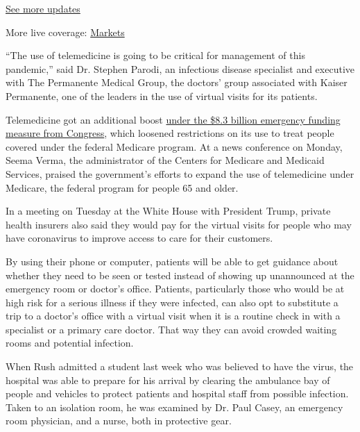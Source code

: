 \href{https://www.nytimes.com/2020/08/04/world/coronavirus-covid-19.html?action=click\&pgtype=Article\&state=default\&region=MAIN_CONTENT_1\&context=storylines_live_updates}{See
more updates}

More live coverage:
\href{https://www.nytimes.com/live/2020/08/03/business/stock-market-today-coronavirus?action=click\&pgtype=Article\&state=default\&region=MAIN_CONTENT_1\&context=storylines_live_updates}{Markets}

``The use of telemedicine is going to be critical for management of this
pandemic,'' said Dr. Stephen Parodi, an infectious disease specialist
and executive with The Permanente Medical Group, the doctors' group
associated with Kaiser Permanente, one of the leaders in the use of
virtual visits for its patients.

Telemedicine got an additional boost
\href{https://www.nytimes.com/2020/03/04/us/politics/coronavirus-emergency-aid-congress.html}{under
the \$8.3 billion emergency funding measure from Congress}, which
loosened restrictions on its use to treat people covered under the
federal Medicare program. At a news conference on Monday, Seema Verma,
the administrator of the Centers for Medicare and Medicaid Services,
praised the government's efforts to expand the use of telemedicine under
Medicare, the federal program for people 65 and older.

In a meeting on Tuesday at the White House with President Trump, private
health insurers also said they would pay for the virtual visits for
people who may have coronavirus to improve access to care for their
customers.

By using their phone or computer, patients will be able to get guidance
about whether they need to be seen or tested instead of showing up
unannounced at the emergency room or doctor's office. Patients,
particularly those who would be at high risk for a serious illness if
they were infected, can also opt to substitute a trip to a doctor's
office with a virtual visit when it is a routine check in with a
specialist or a primary care doctor. That way they can avoid crowded
waiting rooms and potential infection.

When Rush admitted a student last week who was believed to have the
virus, the hospital was able to prepare for his arrival by clearing the
ambulance bay of people and vehicles to protect patients and hospital
staff from possible infection. Taken to an isolation room, he was
examined by Dr. Paul Casey, an emergency room physician, and a nurse,
both in protective gear.

